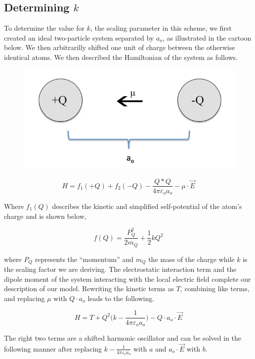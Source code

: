 \subsection{Determining $k$}
To determine the value for $k$, the scaling parameter in this scheme, we first
created an ideal two-particle system separated by $a_o$, as illustrated in the cartoon below.
We then arbitrarilly shifted one unit of charge between
the otherwise identical atoms. We then described the Hamiltonian of the system as follows.
\begin{figure}
  \centering
  \includegraphics[width=0.75\linewidth]{../figures/chap5/determineK2.png}
\end{figure}

\begin{equation*}
H = f_1(+Q) + f_2(-Q) - \frac{Q*Q}{4\pi\varepsilon_o a_o} - \mu\cdot\vec{E}
\end{equation*}

Where $f_1(Q)$ describes the kinetic and simplified self-potential of the
atom's charge and is shown below,

\begin{equation*}
f(Q) = \frac{P_Q^2}{2m_Q} + \frac{1}{2}kQ^2
\end{equation*}

where $P_Q$ represents the ``momentum'' and $m_Q$ the mass of the charge while
$k$ is the scaling factor we are deriving. The electrostatic interaction term
and the dipole moment of the system interacting with the local electric field
complete our description of our model. Rewriting the kinetic terms as $T$,
combining like terms, and replacing $\mu$ with $Q\cdot a_o$ leads to the
following.

\begin{equation*}
H = T + Q^2\bigg(k - \frac{1}{4 \pi\varepsilon_o a_o}\bigg) - Q\cdot a_o \cdot \vec{E}
\end{equation*}

The right two terms are a shifted harmonic oscillator and can be solved in the
following manner after replacing $k-\frac{1}{4\pi\varepsilon_o a_o}$ with $a$
and $a_o\cdot \vec{E}$ with $b$.

